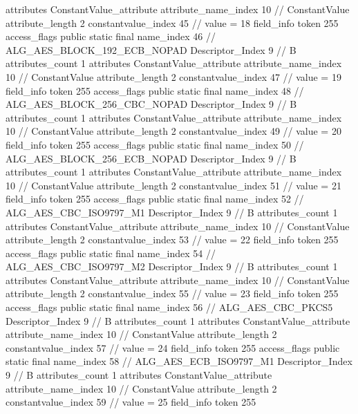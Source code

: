 {{{{{				attributes {
				ConstantValue_attribute {
					attribute_name_index	10		// ConstantValue
					attribute_length	2
					constantvalue_index	45		// value = 18
				}
				}
			}
			field_info {
				token	255
				access_flags	public static final
				name_index	46		// ALG_AES_BLOCK_192_ECB_NOPAD
				Descriptor_Index	9		// B
				attributes_count	1
				attributes {
				ConstantValue_attribute {
					attribute_name_index	10		// ConstantValue
					attribute_length	2
					constantvalue_index	47		// value = 19
				}
				}
			}
			field_info {
				token	255
				access_flags	public static final
				name_index	48		// ALG_AES_BLOCK_256_CBC_NOPAD
				Descriptor_Index	9		// B
				attributes_count	1
				attributes {
				ConstantValue_attribute {
					attribute_name_index	10		// ConstantValue
					attribute_length	2
					constantvalue_index	49		// value = 20
				}
				}
			}
			field_info {
				token	255
				access_flags	public static final
				name_index	50		// ALG_AES_BLOCK_256_ECB_NOPAD
				Descriptor_Index	9		// B
				attributes_count	1
				attributes {
				ConstantValue_attribute {
					attribute_name_index	10		// ConstantValue
					attribute_length	2
					constantvalue_index	51		// value = 21
				}
				}
			}
			field_info {
				token	255
				access_flags	public static final
				name_index	52		// ALG_AES_CBC_ISO9797_M1
				Descriptor_Index	9		// B
				attributes_count	1
				attributes {
				ConstantValue_attribute {
					attribute_name_index	10		// ConstantValue
					attribute_length	2
					constantvalue_index	53		// value = 22
				}
				}
			}
			field_info {
				token	255
				access_flags	public static final
				name_index	54		// ALG_AES_CBC_ISO9797_M2
				Descriptor_Index	9		// B
				attributes_count	1
				attributes {
				ConstantValue_attribute {
					attribute_name_index	10		// ConstantValue
					attribute_length	2
					constantvalue_index	55		// value = 23
				}
				}
			}
			field_info {
				token	255
				access_flags	public static final
				name_index	56		// ALG_AES_CBC_PKCS5
				Descriptor_Index	9		// B
				attributes_count	1
				attributes {
				ConstantValue_attribute {
					attribute_name_index	10		// ConstantValue
					attribute_length	2
					constantvalue_index	57		// value = 24
				}
				}
			}
			field_info {
				token	255
				access_flags	public static final
				name_index	58		// ALG_AES_ECB_ISO9797_M1
				Descriptor_Index	9		// B
				attributes_count	1
				attributes {
				ConstantValue_attribute {
					attribute_name_index	10		// ConstantValue
					attribute_length	2
					constantvalue_index	59		// value = 25
				}
				}
			}
			field_info {
				token	255
}}}}}
